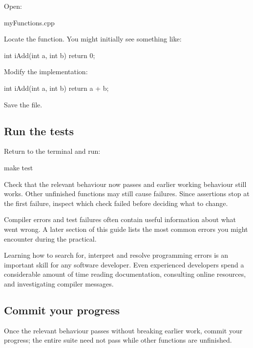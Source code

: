 \documentclass{csc2059practical}
\begin{document}
Open:

\begin{terminal}
myFunctions.cpp
\end{terminal}

Locate the function. You might initially see something like:

\begin{cppcode}
int iAdd(int a, int b)
{
    return 0;
}
\end{cppcode}

Modify the implementation:

\begin{cppcode}
int iAdd(int a, int b)
{
    return a + b;
}
\end{cppcode}

Save the file.

\subsection{Run the tests}

Return to the terminal and run:

\begin{bashcode}
make test
\end{bashcode}

Check that the relevant behaviour now passes and earlier working behaviour still works. Other unfinished functions may still cause failures. Since assertions stop at the first failure, inspect which check failed before deciding what to change.

Compiler errors and test failures often contain useful information about what went wrong. A later section of this guide lists the most common errors you might encounter during the practical.

\begin{tipbox}
Learning how to search for, interpret and resolve programming errors is an important skill for any software developer. Even experienced developers spend a considerable amount of time reading documentation, consulting online resources, and investigating compiler messages.
\end{tipbox}

\subsection{Commit your progress}

Once the relevant behaviour passes without breaking earlier work, commit your progress; the entire suite need not pass while other functions are unfinished.
\end{document}
